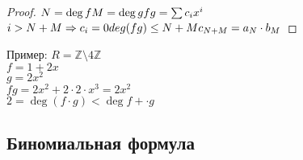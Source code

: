 \begin{properties}
\begin{definition}
		\begin{proof}
			$ N = \deg f \\
			M = \deg g \\
			fg = \sum c_i x^i $ \\
			$ i > N + M \Rightarrow c_i = 0 \\
			deg (fg) \leq N+M \\
			c_{N+M} = a_N \cdot b_M $
		\end{proof}
		Пример: $ R = \mathbb{Z} \setminus 4 \mathbb{Z}  $ \\
		$ f = 1 + 2x $ \\
		$ g = 2x^2 $ \\
		$ fg = 2x^2 + 2 \cdot 2 \cdot x^3 = 2x^2 $ \\
		$ 2 = \deg (f \cdot g) < \deg f + \cdot g  $
	\end{definition}
\end{properties}

\subsection{Биномиальная формула} 

